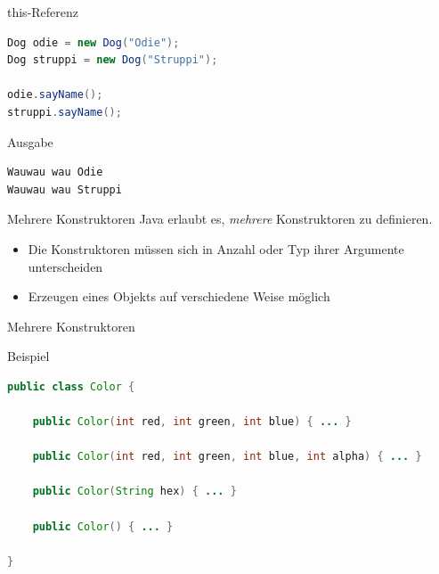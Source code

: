 \documentclass[18pt]{beamer}
\begin{document}
\begin{frame}[fragile]{this-Referenz}
    \begin{exampleblock}{}
        \begin{lstlisting}[language=Java]
Dog odie = new Dog("Odie");
Dog struppi = new Dog("Struppi");

odie.sayName();
struppi.sayName();
        \end{lstlisting}

    \end{exampleblock}

    \begin{exampleblock}{Ausgabe}
        \begin{lstlisting}[language=Java]
Wauwau wau Odie
Wauwau wau Struppi
        \end{lstlisting}

    \end{exampleblock}

\end{frame}

\begin{frame}{Mehrere Konstruktoren}
    Java erlaubt es, \textit{mehrere} Konstruktoren zu definieren.
    \begin{itemize}
        \item Die Konstruktoren müssen sich in Anzahl oder Typ ihrer Argumente unterscheiden
        \item Erzeugen eines Objekts auf verschiedene Weise möglich
    \end{itemize}
\end{frame}

\begin{frame}[fragile]{Mehrere Konstruktoren}
    \begin{exampleblock}{Beispiel}
        \begin{lstlisting}[language=Java,basicstyle=\scriptsize]
public class Color {

    public Color(int red, int green, int blue) { ... }

    public Color(int red, int green, int blue, int alpha) { ... }

    public Color(String hex) { ... }

    public Color() { ... }

}
        \end{lstlisting}

    \end{exampleblock}

\end{frame}
\end{document}
